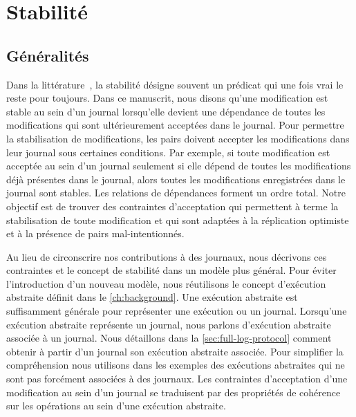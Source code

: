 \section{Stabilité}\label{sec:stability}

\subsection{Généralités}\label{subsec:general-stability}

Dans la littérature~\autocite{baquero_2018_pure-op-crdt, shapiro_2011_crdt,birman_1991_causalmulticast}, la stabilité désigne souvent un prédicat qui une fois vrai le reste pour toujours.
Dans ce manuscrit, nous disons qu'une modification est stable au sein d'un journal lorsqu'elle devient une dépendance de toutes les modifications qui sont ultérieurement acceptées dans le journal.
Pour permettre la stabilisation de modifications, les pairs doivent accepter les modifications dans leur journal sous certaines conditions.
Par exemple, si toute modification est acceptée au sein d'un journal seulement si elle dépend de toutes les modifications déjà présentes dans le journal, alors toutes les modifications enregistrées dans le journal sont stables.
Les relations de dépendances forment un ordre total.
Notre objectif est de trouver des contraintes d'acceptation qui permettent à terme la stabilisation de toute modification et qui sont adaptées à la réplication optimiste et à la présence de pairs mal-intentionnés.

Au lieu de circonscrire nos contributions à des journaux, nous décrivons ces contraintes et le concept de stabilité dans un modèle plus général.
Pour éviter l'introduction d'un nouveau modèle, nous réutilisons le concept d'exécution abstraite définit dans le \autoref{ch:background}.
Une exécution abstraite est suffisamment générale pour représenter une exécution ou un journal.
Lorsqu'une exécution abstraite représente un journal, nous parlons d'exécution abstraite associée à un journal.
Nous détaillons dans la \autoref{sec:full-log-protocol} comment obtenir à partir d'un journal son exécution abstraite associée.
Pour simplifier la compréhension nous utilisons dans les exemples des exécutions abstraites qui ne sont pas forcément associées à des journaux.
Les contraintes d'acceptation d'une modification au sein d'un journal se traduisent par des propriétés de cohérence sur les opérations au sein d'une exécution abstraite.


